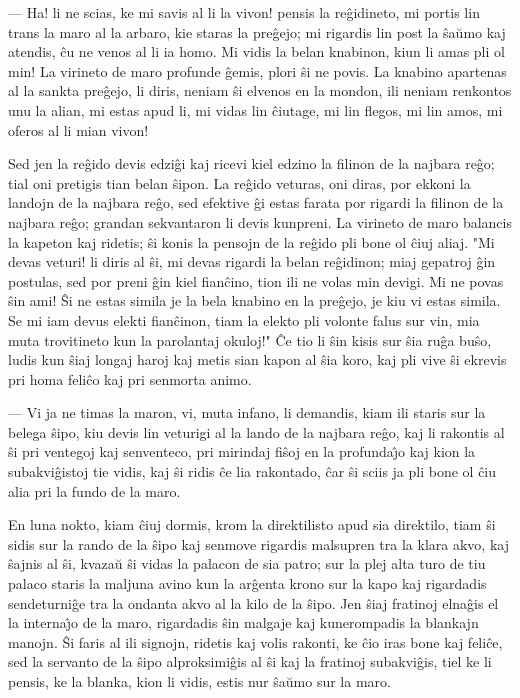  --- Ha! li ne scias, ke mi savis al li la vivon! pensis la
re\^gidineto, mi portis lin trans la maro al la arbaro, kie staras
la pre\^gejo; mi rigardis lin post la \^sa\u umo kaj atendis, \^cu
ne venos al li ia homo. Mi vidis la belan knabinon, kiun li amas pli
ol min! La virineto de maro profunde \^gemis, plori \^si ne povis.
La knabino apartenas al la sankta pre\^gejo, li diris, neniam \^si
elvenos en la mondon, ili neniam renkontos unu la alian, mi estas
apud li, mi vidas lin \^ciutage, mi lin flegos, mi lin amos, mi
oferos al li mian vivon!

   Sed jen la re\^gido devis edzi\^gi kaj ricevi kiel edzino la filinon
de la najbara re\^go; tial oni pretigis tian belan \^sipon. La
re\^gido veturas, oni diras, por ekkoni la landojn de la najbara
re\^go, sed efektive \^gi estas farata por rigardi la filinon de la
najbara re\^go; grandan sekvantaron li devis kunpreni. La virineto
de maro balancis la kapeton kaj ridetis; \^si konis la pensojn de la
re\^gido pli bone ol \^ciuj aliaj. "Mi devas veturi! li diris al
\^si, mi devas rigardi la belan re\^gidinon; miaj gepatroj \^gin
postulas, sed por preni \^gin kiel fian\^cino, tion ili ne volas min
devigi. Mi ne povas \^sin ami! \^Si ne estas simila je la bela
knabino en la pre\^gejo, je kiu vi estas simila. Se mi iam devus
elekti fian\^cinon, tiam la elekto pli volonte falus sur vin, mia
muta trovitineto kun la parolantaj okuloj!" \^Ce tio li \^sin kisis
sur \^sia ru\^ga bu\^so, ludis kun \^siaj longaj haroj kaj metis
sian kapon al \^sia koro, kaj pli vive \^si ekrevis pri homa
feli\^co kaj pri senmorta animo.

 --- Vi ja ne timas la maron, vi, muta infano, li demandis, kiam ili
staris sur la belega \^sipo, kiu devis lin veturigi al la lando de
la najbara re\^go, kaj li rakontis al \^si pri ventegoj kaj
senventeco, pri mirindaj fi\^soj en la profunda\^{\j}o kaj kion la
subakvi\^gistoj tie vidis, kaj \^si ridis \^ce lia rakontado, \^car
\^si sciis ja pli bone ol \^ciu alia pri la fundo de la maro.

   En luna nokto, kiam \^ciuj dormis, krom la direktilisto apud sia
direktilo, tiam \^si sidis sur la rando de la \^sipo kaj senmove
rigardis malsupren tra la klara akvo, kaj \^sajnis al \^si, kvaza\u
u \^si vidas la palacon de sia patro; sur la plej alta turo de tiu
palaco staris la maljuna avino kun la ar\^genta krono sur la kapo
kaj rigardadis sendeturni\^ge tra la ondanta akvo al la kilo de la
\^sipo. Jen \^siaj fratinoj elna\^gis el la interna\^{\j}o de la
maro, rigardadis \^sin malgaje kaj kunerompadis la blankajn manojn.
\^Si faris al ili signojn, ridetis kaj volis rakonti, ke \^cio iras
bone kaj feli\^ce, sed la servanto de la \^sipo alproksimi\^gis al
\^si kaj la fratinoj subakvi\^gis, tiel ke li pensis, ke la blanka,
kion li vidis, estis nur \^sa\u umo sur la maro.

